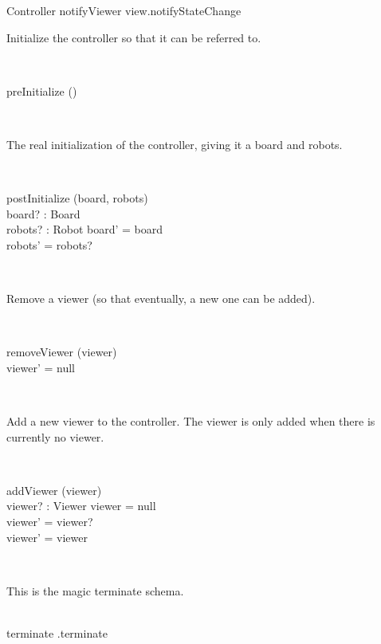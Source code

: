 \begin{class}{Controller}
notifyViewer \sdef view.notifyStateChange \\
\also \also \also
\begin{zpar}
Initialize the controller so that it can be referred to.
\end{zpar} \\
\begin{schema}{preInitialize}
\Delta()
\end{schema}\\
\znewpage
\begin{zpar}
The real initialization of the controller, giving it a board and robots.
\end{zpar} \\
\begin{schema}{postInitialize}
\Delta (board, robots) \\
board? : Board \\
robots? : \power Robot
\where
board' = board \\
robots' = robots?
\end{schema}\\
\begin{zpar}
Remove a viewer (so that eventually, a new one can be added).
\end{zpar} \\
\begin{schema}{removeViewer}
\Delta(viewer) \\
\where
viewer' = null
\end{schema}\\
\begin{zpar}
Add a new viewer to the controller. The viewer is only added when there is currently no viewer.
\end{zpar} \\
\begin{schema}{addViewer}
\Delta(viewer) \\
viewer? : Viewer
\where
\IF viewer = null \\
\THEN viewer' = viewer? \\
\ELSE viewer' = viewer
\end{schema} \\
\begin{zpar}
This is the magic terminate schema.
\end{zpar} \\
terminate \sdef {}.terminate
\end{class}
